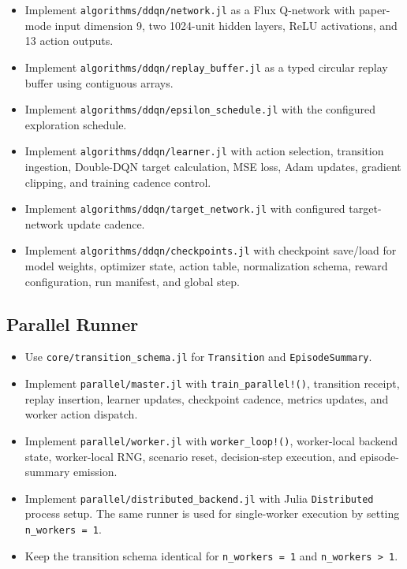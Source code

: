 \documentclass[11pt]{article}
\begin{document}
\begin{itemize}
\item Implement \texttt{algorithms/ddqn/network.jl} as a Flux Q-network with paper-mode input dimension 9, two 1024-unit hidden layers, ReLU activations, and 13 action outputs.
\item Implement \texttt{algorithms/ddqn/replay\_buffer.jl} as a typed circular replay buffer using contiguous arrays.
\item Implement \texttt{algorithms/ddqn/epsilon\_schedule.jl} with the configured exploration schedule.
\item Implement \texttt{algorithms/ddqn/learner.jl} with action selection, transition ingestion, Double-DQN target calculation, MSE loss, Adam updates, gradient clipping, and training cadence control.
\item Implement \texttt{algorithms/ddqn/target\_network.jl} with configured target-network update cadence.
\item Implement \texttt{algorithms/ddqn/checkpoints.jl} with checkpoint save/load for model weights, optimizer state, action table, normalization schema, reward configuration, run manifest, and global step.
\end{itemize}

\subsection{Parallel Runner}

\begin{itemize}
\item Use \texttt{core/transition\_schema.jl} for \texttt{Transition} and \texttt{EpisodeSummary}.
\item Implement \texttt{parallel/master.jl} with \texttt{train\_parallel!()}, transition receipt, replay insertion, learner updates, checkpoint cadence, metrics updates, and worker action dispatch.
\item Implement \texttt{parallel/worker.jl} with \texttt{worker\_loop!()}, worker-local backend state, worker-local RNG, scenario reset, decision-step execution, and episode-summary emission.
\item Implement \texttt{parallel/distributed\_backend.jl} with Julia \texttt{Distributed} process setup. The same runner is used for single-worker execution by setting \texttt{n\_workers = 1}.
\item Keep the transition schema identical for \texttt{n\_workers = 1} and \texttt{n\_workers > 1}.
\end{itemize}
\end{document}
